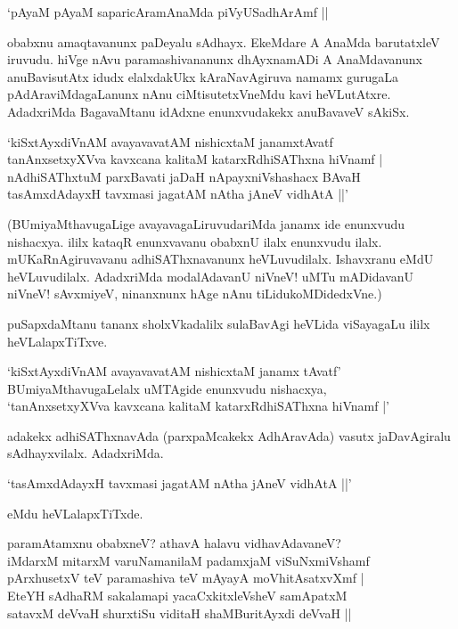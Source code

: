 \begin{shloka}
`pAyaM pAyaM saparicAramAnaMda piVyUSadhArAmf ||
\end{shloka}

obabxnu amaqtavanunx paDeyalu sAdhayx. EkeMdare A AnaMda barutatxleV iruvudu. hiVge nAvu paramashivananunx dhAyxnamADi A AnaMdavanunx anuBavisutAtx idudx elalxdakUkx kAraNavAgiruva namamx gurugaLa pAdAraviMdagaLanunx nAnu ciMtisutetxVneMdu kavi heVLutAtxre. AdadxriMda BagavaMtanu idAdxne enunxvudakekx anuBavaveV sAkiSx.

\begin{shloka}
`kiSxtAyxdiVnAM avayavavatAM nishicxtaM janamxtAvatf\\
tanAnxsetxyXVva kavxcana kalitaM katarxRdhiSAThxna hiVnamf |\\
nAdhiSAThxtuM parxBavati jaDaH nApayxniVshashacx BAvaH\\
tasAmxdAdayxH tavxmasi jagatAM nAtha jAneV vidhAtA ||'
\end{shloka}

(BUmiyaMthavugaLige avayavagaLiruvudariMda janamx ide enunxvudu nishacxya. ililx kataqR enunxvavanu obabxnU ilalx enunxvudu ilalx. mUKaRnAgiruvavanu adhiSAThxnavanunx heVLuvudilalx. Ishavxranu eMdU heVLuvudilalx. AdadxriMda modalAdavanU niVneV! uMTu mADidavanU niVneV! sAvxmiyeV, ninanxnunx hAge nAnu tiLidukoMDidedxVne.)

puSapxdaMtanu tananx sholxVkadalilx sulaBavAgi heVLida viSayagaLu ililx heVLalapxTiTxve.

\begin{shloka}
`kiSxtAyxdiVnAM avayavavatAM nishicxtaM janamx tAvatf'\\
BUmiyaMthavugaLelalx uMTAgide enunxvudu nishacxya,\\
`tanAnxsetxyXVva kavxcana kalitaM katarxRdhiSAThxna hiVnamf |'
\end{shloka}

adakekx adhiSAThxnavAda (parxpaMcakekx AdhAravAda) vasutx jaDavAgiralu sAdhayxvilalx. AdadxriMda.

\begin{shloka}
`tasAmxdAdayxH tavxmasi jagatAM nAtha jAneV vidhAtA ||'
\end{shloka}

eMdu heVLalapxTiTxde.

\begin{shloka}
paramAtamxnu obabxneV? athavA halavu vidhavAdavaneV?\\[5pt]
iMdarxM mitarxM varuNamanilaM padamxjaM viSuNxmiVshamf\\
pArxhusetxV teV paramashiva teV mAyayA moVhitAsatxvXmf |\\[5pt]
EteYH sAdhaRM sakalamapi yacaCxkitxleVsheV samApatxM\\
satavxM deVvaH shurxtiSu viditaH shaMBuritAyxdi deVvaH ||
\end{shloka}

